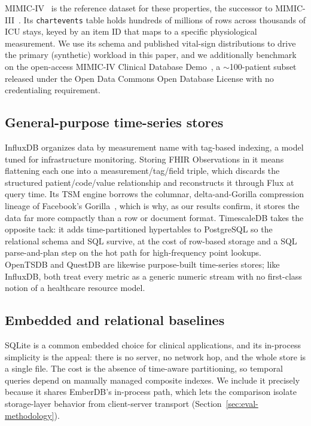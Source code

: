 \documentclass[journal]{IEEEtran}
\begin{document}
MIMIC-IV~\cite{johnson2023mimic} is the reference dataset for these properties, the successor to MIMIC-III~\cite{johnson2016mimic}. Its \texttt{chartevents} table holds hundreds of millions of rows across thousands of ICU stays, keyed by an item ID that maps to a specific physiological measurement. We use its schema and published vital-sign distributions to drive the primary (synthetic) workload in this paper, and we additionally benchmark on the open-access MIMIC-IV Clinical Database Demo~\cite{mimicivdemo}, a $\sim$100-patient subset released under the Open Data Commons Open Database License with no credentialing requirement.

\subsection{General-purpose time-series stores}
InfluxDB organizes data by measurement name with tag-based indexing, a model tuned for infrastructure monitoring. Storing FHIR Observations in it means flattening each one into a measurement/tag/field triple, which discards the structured patient/code/value relationship and reconstructs it through Flux at query time. Its TSM engine borrows the columnar, delta-and-Gorilla compression lineage of Facebook's Gorilla~\cite{gorilla}, which is why, as our results confirm, it stores the data far more compactly than a row or document format. TimescaleDB takes the opposite tack: it adds time-partitioned hypertables to PostgreSQL so the relational schema and SQL survive, at the cost of row-based storage and a SQL parse-and-plan step on the hot path for high-frequency point lookups. OpenTSDB and QuestDB are likewise purpose-built time-series stores; like InfluxDB, both treat every metric as a generic numeric stream with no first-class notion of a healthcare resource model.

\subsection{Embedded and relational baselines}
SQLite is a common embedded choice for clinical applications, and its in-process simplicity is the appeal: there is no server, no network hop, and the whole store is a single file. The cost is the absence of time-aware partitioning, so temporal queries depend on manually managed composite indexes. We include it precisely because it shares EmberDB's in-process path, which lets the comparison isolate storage-layer behavior from client-server transport (Section~\ref{sec:eval-methodology}).
\end{document}
